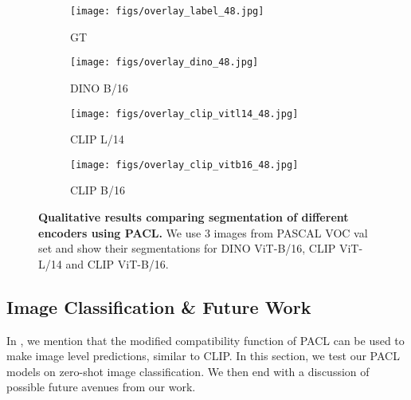 \documentclass[10pt,twocolumn,letterpaper]{article}
\begin{document}
\begin{figure}[!t]
    \begin{subfigure}{0.21\linewidth}
        \centering
        \texttt{[image: figs/overlay\_label\_48.jpg]}
        \caption{GT}
        \vspace{-3mm}
    \end{subfigure}
    \begin{subfigure}{0.21\linewidth}
        \centering
        \texttt{[image: figs/overlay\_dino\_48.jpg]}
        \caption{DINO B/16}
        \vspace{-3mm}
    \end{subfigure}
    \begin{subfigure}{0.21\linewidth}
        \centering
        \texttt{[image: figs/overlay\_clip\_vitl14\_48.jpg]}
        \caption{CLIP L/14}
        \vspace{-3mm}
    \end{subfigure}
    \begin{subfigure}{0.21\linewidth}
        \centering
        \texttt{[image: figs/overlay\_clip\_vitb16\_48.jpg]}
        \caption{CLIP B/16}
        \vspace{-3mm}
    \end{subfigure}

    \caption{\textbf{Qualitative results comparing segmentation of different encoders using PACL.} We use 3 images from PASCAL VOC val set and show their segmentations for DINO ViT-B/16, CLIP ViT-L/14 and CLIP ViT-B/16.}
    \vspace{-2mm}
    \label{fig:segmentation_ablation_qualitative}
\end{figure}



\subsection {Image Classification \& Future Work}
\label{sec:zeroshot_classification}

In , we mention that the modified compatibility function of PACL can be used to make image level predictions, similar to CLIP. In this section, we test our PACL models on zero-shot image classification. We then end with a discussion of possible future avenues from our work.
\end{document}
